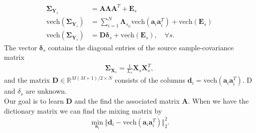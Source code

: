 \begin{align*}
\boldsymbol{\Sigma}_{\mathbf{Y}_s} &= \mathbf{A} \boldsymbol{\Lambda} \mathbf{A}^T + \mathbf{E}_s \\
\text{vech}(\boldsymbol{\Sigma}_{\mathbf{Y}_s}) &= \sum_{i=1}^N \boldsymbol{\Lambda}_{s_{ii}} \text{vech}(\mathbf{a}_i \mathbf{a}_i^T) + \text{vech}(\mathbf{E}_s) \\
\text{vech}(\boldsymbol{\Sigma}_{\mathbf{Y}_s}) &= \mathbf{D} \boldsymbol{\delta}_s + \text{vech}(\mathbf{E}_s), \quad \forall s.
\end{align*}
The vector $\boldsymbol{\delta}_s$ contains the diagonal entries of the source sample-covariance matrix
\begin{align*}
\boldsymbol{\Sigma}_{\mathbf{X}_s} = \frac{1}{L_s} \mathbf{X}_s \mathbf{X}_s^T,
\end{align*}
and the matrix $\mathbf{D} \in \mathbb{R}^{M(M+1)/2 \times N}$ consists of the columns $\mathbf{d}_i = \text{vech}(\mathbf{a}_i \mathbf{a}_i^T)$. D and $\delta_s$ are unknown.
\\
Our goal is to learn $\mathbf{D}$ and the find the associated matrix $\mathbf{A}$. When we have the dictionary matrix we can find  the mixing matrix by
\begin{align*}
\min_{\mathbf{a}_i} \Vert \mathbf{d}_i - \text{vech}(\mathbf{a}_i \mathbf{a}_i^T) \Vert_2^2.
\end{align*}




